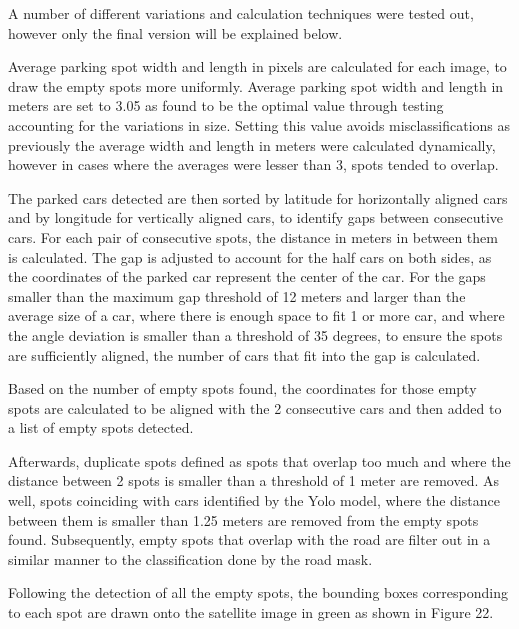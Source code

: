 A number of different variations and calculation techniques were tested out,
however only the final version will be explained below.

Average parking spot width and length in pixels are calculated for each image,
to draw the empty spots more uniformly. Average parking spot width and length in
meters are set to 3.05 as found to be the optimal value through testing
accounting for the variations in size. Setting this value avoids
misclassifications as previously the average width and length in meters were
calculated dynamically, however in cases where the averages were lesser than 3,
spots tended to overlap.

The parked cars detected are then sorted by latitude for horizontally aligned
cars and by longitude for vertically aligned cars, to identify gaps between
consecutive cars. For each pair of consecutive spots, the distance in meters in
between them is calculated. The gap is adjusted to account for the half cars on
both sides, as the coordinates of the parked car represent the center of the
car. For the gaps smaller than the maximum gap threshold of 12 meters and larger
than the average size of a car, where there is enough space to fit 1 or more
car, and where the angle deviation is smaller than a threshold of 35 degrees, to
ensure the spots are sufficiently aligned, the number of cars that fit into the
gap is calculated.

Based on the number of empty spots found, the coordinates for
those empty spots are calculated to be aligned with the 2 consecutive cars and
then added to a list of empty spots detected.

Afterwards, duplicate spots defined as spots that overlap too much and where the
distance between 2 spots is smaller than a threshold of 1 meter are removed. As
well, spots coinciding with cars identified by the Yolo model, where the
distance between them is smaller than 1.25 meters are removed from the empty
spots found. Subsequently, empty spots that overlap with the road are filter out
in a similar manner to the classification done by the road mask.

Following the detection of all the empty spots, the bounding boxes corresponding
to each spot are drawn onto the satellite image in green as shown in
Figure 22.

